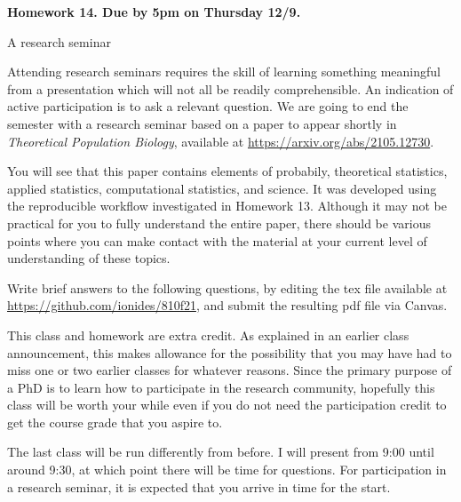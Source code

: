\documentclass[12pt]{article}
\begin{document}
\begin{center}\bf
Homework 14. Due by 5pm on Thursday 12/9.

A research seminar

\end{center}

Attending research seminars requires the skill of learning something meaningful from a presentation which will not all be readily comprehensible. An indication of active participation is to ask a relevant question. We are going to end the semester with a research seminar based on a paper to appear shortly in {\em Theoretical Population Biology}, available at \url{https://arxiv.org/abs/2105.12730}.

You will see that this paper contains elements of probabily, theoretical statistics, applied statistics, computational statistics, and science. It was developed using the reproducible workflow investigated in Homework 13. Although it may not be practical for you to fully understand the entire paper, there should be various points where you can make contact with the material at your current level of understanding of these topics.

Write brief answers to the following questions, by editing the tex file available at \url{https://github.com/ionides/810f21}, and submit the resulting pdf file via Canvas.

This class and homework are extra credit. As explained in an earlier class announcement, this makes allowance for the possibility that you may have had to miss one or two earlier classes for whatever reasons. Since the primary purpose of a PhD is to learn how to participate in the research community, hopefully this class will be worth your while even if you do not need the participation credit to get the course grade that you aspire to.

The last class will be run differently from before. I will present  from 9:00 until around 9:30, at which point there will be time for questions. For participation in a research seminar, it is expected that you arrive in time for the start. 
\end{document}
